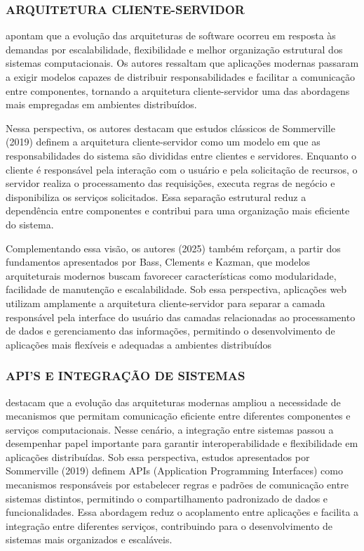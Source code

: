 \documentclass[12pt]{article}
\begin{document}
    \subsubsection{ARQUITETURA CLIENTE-SERVIDOR}

      \cite{ciriano2025arquitetura} apontam que a evolução das arquiteturas de software ocorreu em resposta às demandas por escalabilidade, flexibilidade e melhor organização estrutural dos sistemas computacionais. Os autores ressaltam que aplicações modernas passaram a exigir modelos capazes de distribuir responsabilidades e facilitar a comunicação entre componentes, tornando a arquitetura cliente-servidor uma das abordagens mais empregadas em ambientes distribuídos.

      Nessa perspectiva, os autores destacam que estudos clássicos de Sommerville (2019) definem a arquitetura cliente-servidor como um modelo em que as responsabilidades do sistema são divididas entre clientes e servidores. Enquanto o cliente é responsável pela interação com o usuário e pela solicitação de recursos, o servidor realiza o processamento das requisições, executa regras de negócio e disponibiliza os serviços solicitados. Essa separação estrutural reduz a dependência entre componentes e contribui para uma organização mais eficiente do sistema.

      Complementando essa visão, os autores (2025) também reforçam, a partir dos fundamentos apresentados por Bass, Clements e Kazman, que modelos arquiteturais modernos buscam favorecer características como modularidade, facilidade de manutenção e escalabilidade. Sob essa perspectiva, aplicações web utilizam amplamente a arquitetura cliente-servidor para separar a camada responsável pela interface do usuário das camadas relacionadas ao processamento de dados e gerenciamento das informações, permitindo o desenvolvimento de aplicações mais flexíveis e adequadas a ambientes distribuídos

    \subsubsection{API’S E INTEGRAÇÃO DE SISTEMAS}

      \cite{ciriano2025arquitetura} destacam que a evolução das arquiteturas modernas ampliou a necessidade de mecanismos que permitam comunicação eficiente entre diferentes componentes e serviços computacionais. Nesse cenário, a integração entre sistemas passou a desempenhar papel importante para garantir interoperabilidade e flexibilidade em aplicações distribuídas.
      Sob essa perspectiva, estudos apresentados por Sommerville (2019) definem APIs (Application Programming Interfaces) como mecanismos responsáveis por estabelecer regras e padrões de comunicação entre sistemas distintos, permitindo o compartilhamento padronizado de dados e funcionalidades. Essa abordagem reduz o acoplamento entre aplicações e facilita a integração entre diferentes serviços, contribuindo para o desenvolvimento de sistemas mais organizados e escaláveis.
\end{document}
